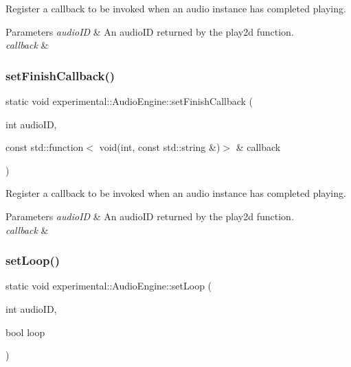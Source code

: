 Register a callback to be invoked when an audio instance has completed playing.


\begin{DoxyParams}{Parameters}
{\em audio\+ID} & An audio\+ID returned by the play2d function. \\
\hline
{\em callback} & \\
\hline
\end{DoxyParams}
\mbox{\label{classexperimental_1_1AudioEngine_a641027899b3a5145093c4db1fae2d1ed}} 
\subsubsection{\texorpdfstring{set\+Finish\+Callback()}{setFinishCallback()}\hspace{0.1cm}{\footnotesize\ttfamily [2/2]}}
{\footnotesize\ttfamily static void experimental\+::\+Audio\+Engine\+::set\+Finish\+Callback (\begin{DoxyParamCaption}\item[{int}]{audio\+ID,  }\item[{const std\+::function$<$ void(int, const std\+::string \&)$>$ \&}]{callback }\end{DoxyParamCaption})\hspace{0.3cm}{\ttfamily [static]}}

Register a callback to be invoked when an audio instance has completed playing.


\begin{DoxyParams}{Parameters}
{\em audio\+ID} & An audio\+ID returned by the play2d function. \\
\hline
{\em callback} & \\
\hline
\end{DoxyParams}
\mbox{\label{classexperimental_1_1AudioEngine_a4d9aa8312f064b9bcdc06888c4306c23}} 
\subsubsection{\texorpdfstring{set\+Loop()}{setLoop()}\hspace{0.1cm}{\footnotesize\ttfamily [1/2]}}
{\footnotesize\ttfamily static void experimental\+::\+Audio\+Engine\+::set\+Loop (\begin{DoxyParamCaption}\item[{int}]{audio\+ID,  }\item[{bool}]{loop }\end{DoxyParamCaption})\hspace{0.3cm}{\ttfamily [static]}}

